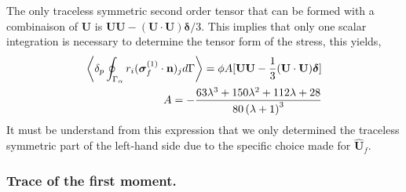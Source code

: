 The only traceless symmetric second order tensor that can be formed with a combinaison of $\textbf{U}$ is $\textbf{UU} - (\textbf{U}\cdot \textbf{U})\bm\delta /3$. 
This implies that only one scalar integration is necessary to determine the tensor form of the  stress, this yields,
\begin{align*}
    \left<\delta_p \oint_{\Gamma_{\alpha}} r_i (\bm\sigma_f^{(1)} \cdot \textbf{n})_j d\Gamma\right>
    = 
    \phi A
    [
        \textbf{UU} - \frac{1}{3}(\textbf{U}\cdot \textbf{U})\bm\delta 
    ]\\
    A= - \frac{63 \lambda^{3} + 150 \lambda^{2} + 112 \lambda + 28}{80 \left(\lambda + 1\right)^{3}}
\end{align*}
It must be understand from this expression that we only determined the traceless symmetric part of the left-hand side due to the specific choice made for $\hat{\textbf{U}}_f$. 

\subsubsection{Trace of the first moment.}

